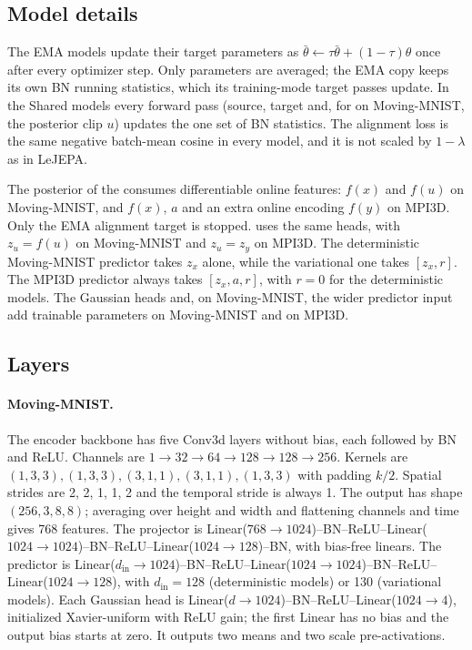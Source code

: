\begin{table}[htbp]
\caption{Training recipes. EMA momentum applies to the EMA models, SIGReg to the Shared models and the KL term to the variational models.}
\label{tab:training}
\centering
\small

\end{table}

\subsection{Model details}
\label{app:modeldetails}

The EMA models update their target parameters as $\bar\theta\leftarrow\tau\bar\theta+(1-\tau)\theta$ once after every optimizer step. Only parameters are averaged; the EMA copy keeps its own BN running statistics, which its training-mode target passes update. In the Shared models every forward pass (source, target and, for \shvar{} on Moving-MNIST, the posterior clip $u$) updates the one set of BN statistics. The alignment loss is the same negative batch-mean cosine in every model, and it is not scaled by $1-\lambda$ as in LeJEPA.

The posterior of the \emavar{} consumes differentiable online features: $f(x)$ and $f(u)$ on Moving-MNIST, and $f(x)$, $a$ and an extra online encoding $f(y)$ on MPI3D. Only the EMA alignment target is stopped. \shvar{} uses the same heads, with $z_u=f(u)$ on Moving-MNIST and $z_u=z_y$ on MPI3D. The deterministic Moving-MNIST predictor takes $z_x$ alone, while the variational one takes $[z_x,r]$. The MPI3D predictor always takes $[z_x,a,r]$, with $r=0$ for the deterministic models. The Gaussian heads and, on Moving-MNIST, the wider predictor input add \VMMHeadParams{} trainable parameters on Moving-MNIST and \VMPHeadParams{} on MPI3D.

\subsection{Layers}

\paragraph{Moving-MNIST.} The encoder backbone has five Conv3d layers without bias, each followed by BN and ReLU. Channels are $1\to32\to64\to128\to128\to256$. Kernels are $(1,3,3),(1,3,3),(3,1,1),(3,1,1),(1,3,3)$ with padding $k/2$. Spatial strides are 2, 2, 1, 1, 2 and the temporal stride is always 1. The output has shape $(256,3,8,8)$; averaging over height and width and flattening channels and time gives 768 features. The projector is Linear($768\to1024$)--BN--ReLU--Linear($1024\to1024$)--BN--ReLU--Linear($1024\to128$)--BN, with bias-free linears. The predictor is Linear($d_{\mathrm{in}}\to1024$)--BN--ReLU--Linear($1024\to1024$)--BN--ReLU--Linear($1024\to128$), with $d_{\mathrm{in}}=128$ (deterministic models) or 130 (variational models). Each Gaussian head is Linear($d\to1024$)--BN--ReLU--Linear($1024\to4$), initialized Xavier-uniform with ReLU gain; the first Linear has no bias and the output bias starts at zero. It outputs two means and two scale pre-activations.


